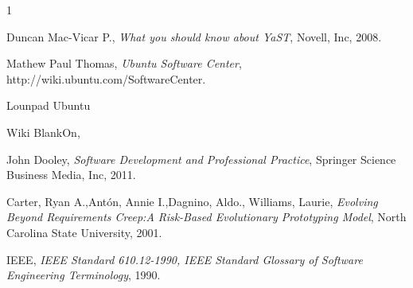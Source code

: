 \documentclass[conference, letterpaper]{IEEEtran}
\begin{document}
%
%
%
\begin{thebibliography}
{1}

Duncan Mac-Vicar P., \emph{What you should know about YaST}, Novell, Inc, 2008.

Mathew Paul Thomas, \emph{Ubuntu Software Center}, http://wiki.ubuntu.com/SoftwareCenter.

Lounpad Ubuntu

Wiki BlankOn,

John Dooley, \emph{Software Development and Professional Practice}, Springer Science Business Media, Inc, 2011.

Carter, Ryan A.,Antón, Annie I.,Dagnino, Aldo., Williams, Laurie, \emph{Evolving Beyond Requirements Creep:A Risk-Based Evolutionary Prototyping Model}, North Carolina State University, 2001.

IEEE, \emph{IEEE Standard 610.12-1990, IEEE Standard Glossary of Software Engineering Terminology}, 1990.

\end{thebibliography}

\end{document}
